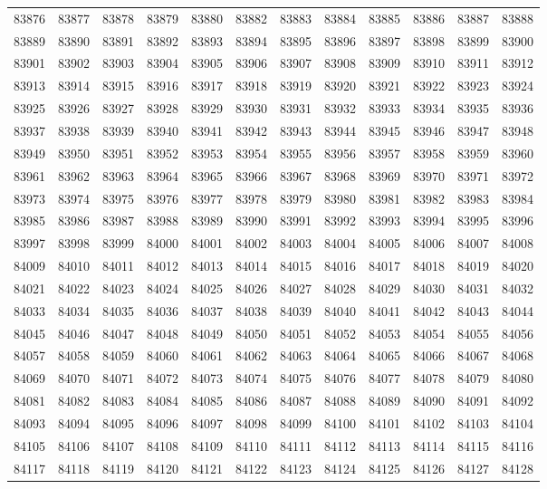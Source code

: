 \begin{center}
\begin{longtable}{llllllllllll}
83876 &83877 &83878 &83879 &83880 &83882 &83883 &83884 &83885 &83886 &83887 &83888 \\
83889 &83890 &83891 &83892 &83893 &83894 &83895 &83896 &83897 &83898 &83899 &83900 \\
83901 &83902 &83903 &83904 &83905 &83906 &83907 &83908 &83909 &83910 &83911 &83912 \\
83913 &83914 &83915 &83916 &83917 &83918 &83919 &83920 &83921 &83922 &83923 &83924 \\
83925 &83926 &83927 &83928 &83929 &83930 &83931 &83932 &83933 &83934 &83935 &83936 \\
83937 &83938 &83939 &83940 &83941 &83942 &83943 &83944 &83945 &83946 &83947 &83948 \\
83949 &83950 &83951 &83952 &83953 &83954 &83955 &83956 &83957 &83958 &83959 &83960 \\
83961 &83962 &83963 &83964 &83965 &83966 &83967 &83968 &83969 &83970 &83971 &83972 \\
83973 &83974 &83975 &83976 &83977 &83978 &83979 &83980 &83981 &83982 &83983 &83984 \\
83985 &83986 &83987 &83988 &83989 &83990 &83991 &83992 &83993 &83994 &83995 &83996 \\
83997 &83998 &83999 &84000 &84001 &84002 &84003 &84004 &84005 &84006 &84007 &84008 \\
84009 &84010 &84011 &84012 &84013 &84014 &84015 &84016 &84017 &84018 &84019 &84020 \\
84021 &84022 &84023 &84024 &84025 &84026 &84027 &84028 &84029 &84030 &84031 &84032 \\
84033 &84034 &84035 &84036 &84037 &84038 &84039 &84040 &84041 &84042 &84043 &84044 \\
84045 &84046 &84047 &84048 &84049 &84050 &84051 &84052 &84053 &84054 &84055 &84056 \\
84057 &84058 &84059 &84060 &84061 &84062 &84063 &84064 &84065 &84066 &84067 &84068 \\
84069 &84070 &84071 &84072 &84073 &84074 &84075 &84076 &84077 &84078 &84079 &84080 \\
84081 &84082 &84083 &84084 &84085 &84086 &84087 &84088 &84089 &84090 &84091 &84092 \\
84093 &84094 &84095 &84096 &84097 &84098 &84099 &84100 &84101 &84102 &84103 &84104 \\
84105 &84106 &84107 &84108 &84109 &84110 &84111 &84112 &84113 &84114 &84115 &84116 \\
84117 &84118 &84119 &84120 &84121 &84122 &84123 &84124 &84125 &84126 &84127 &84128 \\

\end{longtable}
\end{center}
